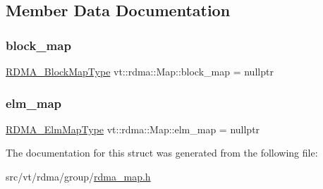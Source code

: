 \subsection{Member Data Documentation}
\mbox{\label{structvt_1_1rdma_1_1_map_a4c23ea8b0775c9598d818348e66b4976}} 
\subsubsection{\texorpdfstring{block\+\_\+map}{block\_map}}
{\footnotesize\ttfamily \hyperlink{namespacevt_1_1rdma_a049e294a5236ad30692253d5f82886c9}{R\+D\+M\+A\+\_\+\+Block\+Map\+Type} vt\+::rdma\+::\+Map\+::block\+\_\+map = nullptr}

\mbox{\label{structvt_1_1rdma_1_1_map_ab333842b2ae2f3efe15f1190bac32df2}} 
\subsubsection{\texorpdfstring{elm\+\_\+map}{elm\_map}}
{\footnotesize\ttfamily \hyperlink{namespacevt_1_1rdma_a6798ab36a5dcb8749c25dff719f9ce07}{R\+D\+M\+A\+\_\+\+Elm\+Map\+Type} vt\+::rdma\+::\+Map\+::elm\+\_\+map = nullptr}



The documentation for this struct was generated from the following file\+:\begin{DoxyCompactItemize}
\item 
src/vt/rdma/group/\hyperlink{rdma__map_8h}{rdma\+\_\+map.\+h}\end{DoxyCompactItemize}
